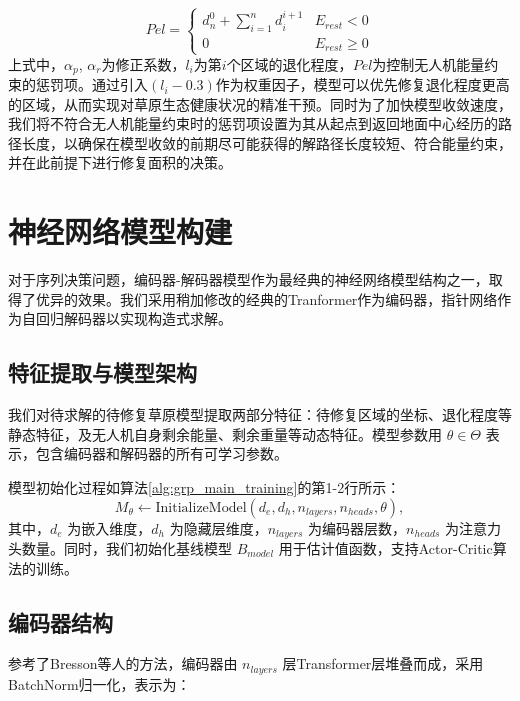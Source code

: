 \documentclass[AutoFakeBold]{LZUThesis}
\begin{document}
\begin{equation}
	Pel=\left\{\begin{array}{ll}
		d_{n}^{0}+\sum\limits_{i=1}^{n}d_{i}^{i+1} & E_{rest}<0     \\
		0                                          & E_{rest}\geq 0
	\end{array}\right.
	\label{eq:12}
\end{equation}
上式中，$\alpha_p$, $\alpha_r$为修正系数，$l_i$为第$i$个区域的退化程度，$Pel$为控制无人机能量约束的惩罚项。通过引入$(l_i-0.3)$作为权重因子，模型可以优先修复退化程度更高的区域，从而实现对草原生态健康状况的精准干预。同时为了加快模型收敛速度，我们将不符合无人机能量约束时的惩罚项设置为其从起点到返回地面中心经历的路径长度，以确保在模型收敛的前期尽可能获得的解路径长度较短、符合能量约束，并在此前提下进行修复面积的决策。

\section{神经网络模型构建}

对于序列决策问题，编码器-解码器模型\cite{vaswani2017attention}作为最经典的神经网络模型结构之一，取得了优异的效果。我们采用稍加修改的经典的Tranformer作为编码器，指针网络\cite{vinyals2015pointer}作为自回归解码器以实现构造式求解。

\subsection{特征提取与模型架构}

我们对待求解的待修复草原模型提取两部分特征：待修复区域的坐标、退化程度等静态特征，及无人机自身剩余能量、剩余重量等动态特征。模型参数用 $\theta \in \Theta$ 表示，包含编码器和解码器的所有可学习参数。

模型初始化过程如算法\ref{alg:grp_main_training}的第1-2行所示：
\begin{equation}
	M_{\theta} \leftarrow \text{InitializeModel}(d_e, d_h, n_{layers}, n_{heads}, \theta),
\end{equation}
其中，$d_e$ 为嵌入维度，$d_h$ 为隐藏层维度，$n_{layers}$ 为编码器层数，$n_{heads}$ 为注意力头数量。同时，我们初始化基线模型 $B_{model}$ 用于估计值函数，支持Actor-Critic算法的训练。

\subsection{编码器结构}

参考了Bresson\cite{bresson2021transformer}等人的方法，编码器由 $n_{layers}$ 层Transformer层堆叠而成，采用BatchNorm归一化，表示为：
\end{document}
